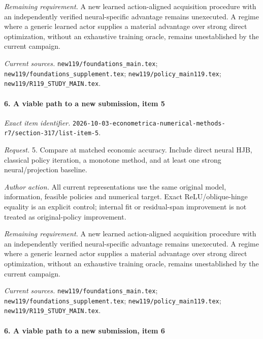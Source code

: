 \par\emph{Remaining requirement.} A new learned action-aligned acquisition procedure with an independently verified neural-specific advantage remains unexecuted. A regime where a generic learned actor supplies a material advantage over strong direct optimization, without an exhaustive training oracle, remains unestablished by the current campaign.

\par\emph{Current sources.} \nolinkurl{new119/foundations_main.tex}; \nolinkurl{new119/foundations_supplement.tex}; \nolinkurl{new119/policy_main119.tex}; \nolinkurl{new119/R119_STUDY_MAIN.tex}.

\paragraph{6. A viable path to a new submission, item 5}

\emph{Exact item identifier.} \nolinkurl{2026-10-03-econometrica-numerical-methods-r7/section-317/list-item-5}.

\par\emph{Request.} 5. Compare at matched economic accuracy. Include direct neural HJB, classical policy iteration, a monotone method, and at least one strong neural/\allowbreak{}projection baseline.

\par\emph{Author action.} All current representations use the same original model, information, feasible policies and numerical target. Exact ReLU/\allowbreak{}oblique-hinge equality is an explicit control; internal fit or residual-span improvement is not treated as original-policy improvement.

\par\emph{Remaining requirement.} A new learned action-aligned acquisition procedure with an independently verified neural-specific advantage remains unexecuted. A regime where a generic learned actor supplies a material advantage over strong direct optimization, without an exhaustive training oracle, remains unestablished by the current campaign.

\par\emph{Current sources.} \nolinkurl{new119/foundations_main.tex}; \nolinkurl{new119/foundations_supplement.tex}; \nolinkurl{new119/policy_main119.tex}; \nolinkurl{new119/R119_STUDY_MAIN.tex}.

\paragraph{6. A viable path to a new submission, item 6}

